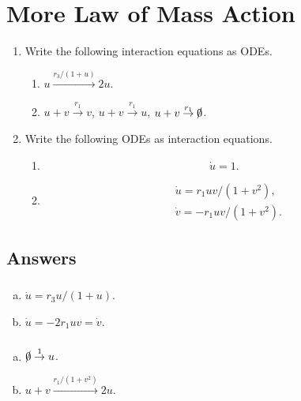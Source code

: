 \documentclass[]{article}
\newcommand{\bb}{\begin{equation}}
\newcommand{\ee}{\end{equation}}
\begin{document}
\section{More Law of Mass Action}
\begin{enumerate}
\item Write the following interaction equations as ODEs.
\begin{enumerate}
\item $u\stackrel{r_3/(1+u)}{\rightarrow}2u$.
\item $u+v\stackrel{r_1}{\rightarrow}v$, $u+v\stackrel{r_1}{\rightarrow}u$, $u+v\stackrel{r_1}{\rightarrow}\slashed{0}$.
\end{enumerate}

\item Write the following ODEs as interaction equations.
\begin{enumerate}
\item 
\bb
\dot{u}=1\nonumber.
\ee
\item 
\begin{align}
&\dot{u}=r_1uv/(1+v^2),\nonumber\\
&\dot{v}=-r_1uv/(1+v^2).\nonumber
\end{align}
\end{enumerate}
\end{enumerate}
\begin{Answ}
\subsection{Answers}
\subsubsection{}
\begin{enumerate}[(a)]
\item $\dot{u}=r_3u/(1+u)$.
\item $\dot{u}=-2r_1uv=\dot{v}$.
\end{enumerate}
\subsubsection{}
\begin{enumerate}[(a)]
\item $\slashed{0}\stackrel{1}{\rightarrow}u$.
\item $u+v\stackrel{r_1/(1+v^2)}{\rightarrow}2u$.
\end{enumerate}
\end{Answ}
\end{document}
